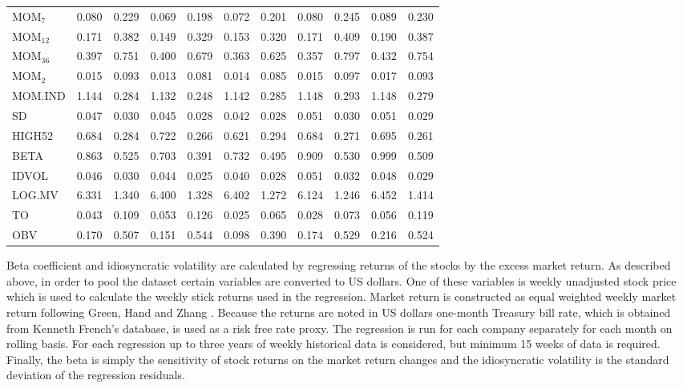 \documentclass{article}
\begin{document}
\begin{table}[ht]
\begin{tabularx}{\textwidth}{@{\extracolsep{1pt}} X r r r r r r r r r r}
MOM$_{7}$ 	& 0.080 	& 0.229	& 0.069 	& 0.198	& 0.072	& 0.201	& 0.080	& 0.245	& 0.089	& 0.230 \\
MOM$_{12}$ 	& 0.171	& 0.382	& 0.149 	& 0.329	& 0.153	& 0.320	& 0.171	& 0.409	& 0.190	& 0.387 \\
MOM$_{36}$ 	& 0.397	& 0.751	& 0.400 	& 0.679	& 0.363	& 0.625	& 0.357	& 0.797	& 0.432	& 0.754 \\
MOM$_{2}$ 	& 0.015 	& 0.093	& 0.013 	& 0.081	& 0.014	& 0.085	& 0.015	& 0.097	& 0.017	& 0.093 \\ 
MOM.IND 	& 1.144 	& 0.284	& 1.132 	& 0.248	& 1.142	& 0.285	& 1.148	& 0.293	& 1.148	& 0.279 \\
SD	 		& 0.047	& 0.030	& 0.045 	& 0.028	& 0.042	& 0.028	& 0.051	& 0.030	& 0.051	& 0.029 \\
HIGH52		& 0.684 	& 0.284	& 0.722 	& 0.266	& 0.621	& 0.294	& 0.684	& 0.271	& 0.695	& 0.261 \\
BETA	 	& 0.863 	& 0.525	& 0.703 	& 0.391	& 0.732	& 0.495	& 0.909	& 0.530	& 0.999	& 0.509 \\
IDVOL	 	& 0.046 	& 0.030	& 0.044 	& 0.025	& 0.040	& 0.028	& 0.051	& 0.032	& 0.048	& 0.029 \\ 
LOG.MV	 	& 6.331  	& 1.340	& 6.400 	& 1.328	& 6.402	& 1.272	& 6.124	& 1.246	& 6.452	& 1.414 \\ 
TO		 	& 0.043  	& 0.109	& 0.053 	& 0.126	& 0.025	& 0.065	& 0.028	& 0.073	& 0.056	& 0.119 \\
OBV		 	& 0.170 	& 0.507	& 0.151 	& 0.544	& 0.098	& 0.390	& 0.174	& 0.529	& 0.216	& 0.524 \\ 
\bottomrule
\end{tabularx}
\end{table} 

Beta coefficient and idiosyncratic volatility are calculated by regressing returns of the stocks by the excess market return. As described above, in order to pool the dataset certain variables are converted to US dollars. One of these variables is weekly unadjusted stock price which is used to calculate the weekly stick returns used in the regression. Market return is constructed as equal weighted weekly market return following Green, Hand and Zhang \citeyear{Green2017}. Because the returns are noted in US dollars one-month Treasury bill rate, which is obtained from Kenneth French's database, is used as a risk free rate proxy. The regression is run for each company separately for each month on rolling basis. For each regression up to three years of weekly historical data is considered, but minimum 15 weeks of data is required. Finally, the beta is simply the sensitivity of stock returns on the market return changes and the idiosyncratic volatility is the standard deviation of the regression residuals.
\end{document}
